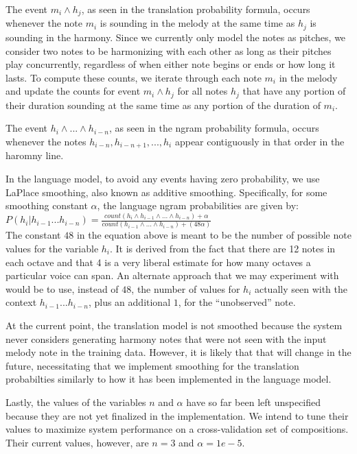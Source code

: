 \documentclass{sig-alternate}
\begin{document}
The event $m_{i} \wedge h_{j}$, as seen in the translation probability formula, occurs whenever the note $m_{i}$ is sounding in the melody at the same time as $h_{j}$ is sounding in the harmony. Since we currently only model the notes as pitches, we consider two notes to be harmonizing with each other as long as their pitches play concurrently, regardless of when either note begins or ends or how long it lasts. To compute these counts, we iterate through each note $m_{i}$ in the melody and update the counts for event $m_{i} \wedge h_{j}$ for all notes $h_{j}$ that have any portion of their duration sounding at the same time as any portion of the duration of $m_{i}$.

The event $h_{i} \wedge ... \wedge h_{i - n}$, as seen in the ngram probability formula, occurs whenever the notes $h_{i - n}, h_{i - n + 1}, ..., h_{i}$ appear contiguously in that order in the haromny line. 

In the language model, to avoid any events having zero probability, we use LaPlace smoothing, also known as additive smoothing. Specifically, for some smoothing constant $\alpha$, the language ngram probabilities are given by: \\

$P(h_{i} | h_{i - 1} ... h_{i - n}) = \frac{count(h_{i} \wedge h_{i - 1} \wedge ... \wedge h_{i - n}) + \alpha}{count(h_{i - 1} \wedge ... \wedge h_{i - n}) + (48\alpha)}$\\

The constant $48$ in the equation above is meant to be the number of possible note values for the variable $h_{i}$. It is derived from the fact that there are 12 notes in each octave and that 4 is a very liberal estimate for how many octaves a particular voice can span. An alternate approach that we may experiment with would be to use, instead of $48$, the number of values for $h_{i}$ actually seen with the context $h_{i -1} ... h_{i - n}$, plus an additional $1$, for the ``unobserved'' note.

At the current point, the translation model is not smoothed because the system never considers generating harmony notes that were not seen with the input melody note in the training data. However, it is likely that that will change in the future, necessitating that we implement smoothing for the translation probabilties similarly to how it has been implemented in the language model. 

Lastly, the values of the variables $n$ and $\alpha$ have so far been left unspecified because they are not yet finalized in the implementation. We intend to tune their values to maximize system performance on a cross-validation set of compositions. Their current values, however, are $n = 3$ and $\alpha = 1e-5$.
\end{document}
